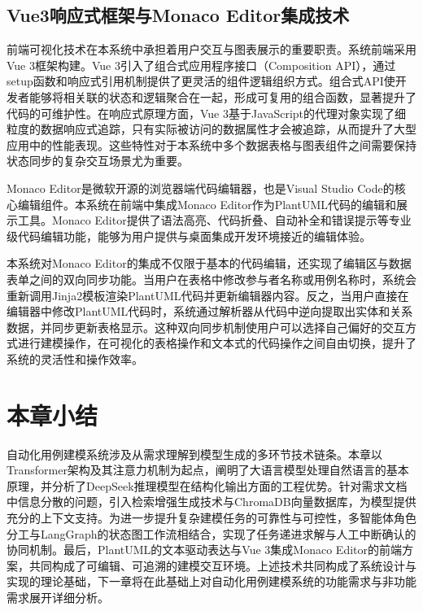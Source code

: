 \subsection{Vue3响应式框架与Monaco Editor集成技术}

前端可视化技术在本系统中承担着用户交互与图表展示的重要职责。系统前端采用Vue 3框架构建。Vue 3引入了组合式应用程序接口（Composition API），通过setup函数和响应式引用机制提供了更灵活的组件逻辑组织方式。组合式API使开发者能够将相关联的状态和逻辑聚合在一起，形成可复用的组合函数，显著提升了代码的可维护性。在响应式原理方面，Vue 3基于JavaScript的代理对象实现了细粒度的数据响应式追踪，只有实际被访问的数据属性才会被追踪，从而提升了大型应用中的性能表现。这些特性对于本系统中多个数据表格与图表组件之间需要保持状态同步的复杂交互场景尤为重要。

Monaco Editor是微软开源的浏览器端代码编辑器，也是Visual Studio Code的核心编辑组件。本系统在前端中集成Monaco Editor作为PlantUML代码的编辑和展示工具。Monaco Editor提供了语法高亮、代码折叠、自动补全和错误提示等专业级代码编辑功能，能够为用户提供与桌面集成开发环境接近的编辑体验。

本系统对Monaco Editor的集成不仅限于基本的代码编辑，还实现了编辑区与数据表单之间的双向同步功能。当用户在表格中修改参与者名称或用例名称时，系统会重新调用Jinja2模板渲染PlantUML代码并更新编辑器内容。反之，当用户直接在编辑器中修改PlantUML代码时，系统通过解析器从代码中逆向提取出实体和关系数据，并同步更新表格显示。这种双向同步机制使用户可以选择自己偏好的交互方式进行建模操作，在可视化的表格操作和文本式的代码操作之间自由切换，提升了系统的灵活性和操作效率。

\section{本章小结}
自动化用例建模系统涉及从需求理解到模型生成的多环节技术链条。本章以Transformer架构及其注意力机制为起点，阐明了大语言模型处理自然语言的基本原理，并分析了DeepSeek推理模型在结构化输出方面的工程优势。针对需求文档中信息分散的问题，引入检索增强生成技术与ChromaDB向量数据库，为模型提供充分的上下文支持。为进一步提升复杂建模任务的可靠性与可控性，多智能体角色分工与LangGraph的状态图工作流相结合，实现了任务递进求解与人工中断确认的协同机制。最后，PlantUML的文本驱动表达与Vue 3集成Monaco Editor的前端方案，共同构成了可编辑、可追溯的建模交互环境。上述技术共同构成了系统设计与实现的理论基础，下一章将在此基础上对自动化用例建模系统的功能需求与非功能需求展开详细分析。